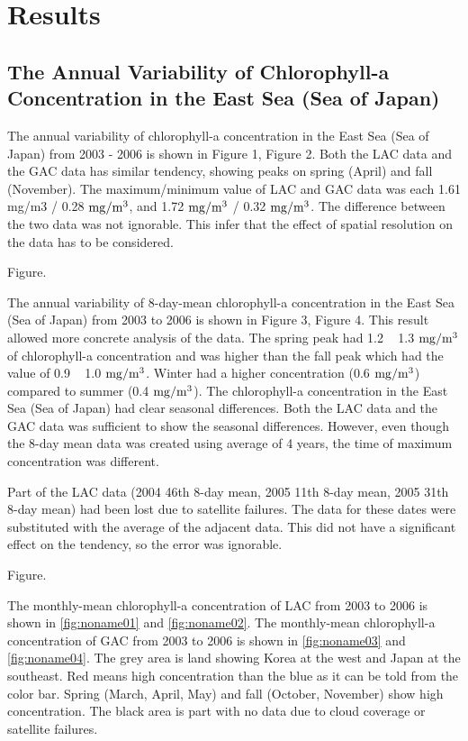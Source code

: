 
\section{Results}
 
\subsection{The Annual Variability of Chlorophyll-a Concentration in the East Sea (Sea of Japan)}
 
The annual variability of chlorophyll-a concentration in the East Sea (Sea of Japan) from 2003 - 2006 is shown in Figure 1, Figure 2. Both the LAC data and the GAC data has similar tendency, showing peaks on spring (April) and fall (November). The maximum/minimum value of LAC and GAC data was each 1.61 mg/m3 / 0.28 $\rm mg/m^3$, and 1.72 $\rm mg/m^3$ / 0.32 $\rm mg/m^3$. The difference between the two data was not ignorable. This infer that the effect of spatial resolution on the data has to be considered.
  
 Figure.
 
The annual variability of 8-day-mean chlorophyll-a concentration in the East Sea (Sea of Japan) from 2003 to 2006 is shown in Figure 3, Figure 4. This result allowed more concrete analysis of the data. The spring peak had 1.2 ~ 1.3 $\rm mg/m^3$ of chlorophyll-a concentration and was higher than the fall peak which had the value of 0.9 ~ 1.0 $\rm mg/m^3$. Winter had a higher concentration (0.6 $\rm mg/m^3$) compared to summer (0.4 $\rm mg/m^3$). The chlorophyll-a concentration in the East Sea (Sea of Japan) had clear seasonal differences. Both the LAC data and the GAC data was sufficient to show the seasonal differences. However, even though the 8-day mean data was created using average of 4 years, the time of maximum concentration was different. 

Part of the LAC data (2004 46th 8-day mean, 2005 11th 8-day mean, 2005 31th 8-day mean) had been lost due to satellite failures. The data for these dates were substituted with the average of the adjacent data. This did not have a significant effect on the tendency, so the error was ignorable.
  
  Figure.
 
The monthly-mean chlorophyll-a concentration of LAC from 2003 to 2006 is shown in \ref{fig:noname01} and \ref{fig:noname02}. The monthly-mean chlorophyll-a concentration of GAC from 2003 to 2006 is shown in \ref{fig:noname03} and \ref{fig:noname04}. The grey area is land showing Korea at the west and Japan at the southeast. Red means high concentration than the blue as it can be told from the color bar. Spring (March, April, May) and fall (October, November) show high concentration. The black area is part with no data due to cloud coverage or satellite failures. 
    
